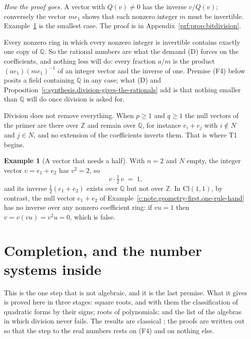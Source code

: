 \documentclass[11pt]{article}
\theoremstyle{definition}
\newtheorem{example}[theorem]{Example}
\theoremstyle{plain}
\providecommand{\Cl}{}\renewcommand{\Cl}{\mathrm{Cl}}
\providecommand{\Q}{}\renewcommand{\Q}{\mathbb{Q}}
\providecommand{\Z}{}\renewcommand{\Z}{\mathbb{Z}}
\begin{document}
\label{c:note.geometry-first.setting-division-rationals-2}
\noindent\emph{How the proof goes.} A vector with $Q(v) \neq 0$ has the inverse $v/Q(v)$; conversely the vector $m e_{1}$ shows that each nonzero integer $m$ must be invertible. Example~\ref{c:note.geometry-first.vector-needs-half} is the smallest case. The proof is in Appendix~\ref{prf:prop:bitdivision}.

Every nonzero ring in which every nonzero integer is invertible contains exactly one copy of $\Q$. So the rational numbers are what the demand (D) forces on the coefficients, and nothing less will do: every fraction $a/m$ is the product $(a e_{1})(m e_{1})^{-1}$ of an integer vector and the inverse of one. Premise (F4) below posits a field containing $\Q$ in any case; what (D) and Proposition~\ref{c:synthesis.division-gives-the-rationals} add is that nothing smaller than $\Q$ will do once division is asked for.

Division does not remove everything. When $p \geq 1$ and $q \geq 1$ the null vectors of the primer \cite[Section 4]{ButlerT0} are there over $\Z$ and remain over $\Q$, for instance $e_{i} + e_{j}$ with $i \notin N$ and $j \in N$, and no extension of the coefficients inverts them. That is where T1 begins.

\begin{example}[A vector that needs a half]\label{c:note.geometry-first.vector-needs-half}
With $n = 2$ and $N$ empty, the integer vector $v = e_{1} + e_{2}$ has $v^{2} = 2$, so
\[
v \cdot \tfrac12\,v \;=\; 1 ,
\]
and its inverse $\tfrac12(e_{1} + e_{2})$ exists over $\Q$ but not over $\Z$. In $\Cl(1,1)$, by contrast, the null vector $e_{1} + e_{2}$ of Example~\ref{c:note.geometry-first.one-rule-hand} has no inverse over any nonzero coefficient ring: if $vu = 1$ then $v = v(vu) = v^{2}u = 0$, which is false.
\end{example}

\section{Completion, and the number systems inside}

\label{c:note.geometry-first.setting-completion-number-systems-inside}
This is the one step that is not algebraic, and it is the last premise. What it gives is proved here in three stages: square roots, and with them the classification of quadratic forms by their signs; roots of polynomials; and the list of the algebras in which division never fails. The results are classical \cite{Lam2005, Ebbinghaus1991}; the proofs are written out so that the step to the real numbers rests on (F4) and on nothing else.
\end{document}
